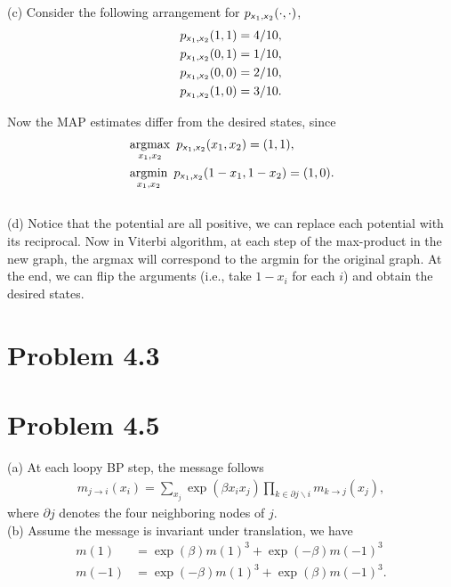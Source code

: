 \documentclass{article}
\newcommand{\s}[1]{\textsf{\textit{#1}}}
\newcommand{\qeds}{\hfill\qedsymbol}
\DeclareMathOperator*{\argmax}{argmax}
\DeclareMathOperator*{\argmin}{argmin}
\begin{document}
\noindent
(c)
%
Consider the following arrangement for $p_{\s{x}_1, \s{x}_2}(\cdot, \cdot)$,
\begin{align*}
	p_{\s{x}_1, \s{x}_2}(1, 1) &= 4/10,\\
	p_{\s{x}_1, \s{x}_2}(0, 1) &= 1/10,\\
	p_{\s{x}_1, \s{x}_2}(0, 0) &= 2/10,\\
	p_{\s{x}_1, \s{x}_2}(1, 0) &= 3/10.
\end{align*}

Now the MAP estimates differ from the desired states, since
\begin{align*}
	&\argmax_{x_1, x_2}\ p_{\s{x}_1, \s{x}_2}(x_1, x_2) = (1, 1),\\
	&\argmin_{x_1, x_2}\ p_{\s{x}_1, \s{x}_2}(1-x_1, 1-x_2) = (1, 0).
\end{align*}\qeds
\\

\noindent
(d)
%
Notice that the potential are all positive, we can replace each potential with its reciprocal.
Now in Viterbi algorithm, at each step of the max-product in the new graph, the argmax will correspond
to the argmin for the original graph. At the end, we can flip the arguments (i.e., take $1-x_i$ for each $i$)
and obtain the desired states.

\pagebreak
\section*{Problem 4.3}

\pagebreak
\section*{Problem 4.5}
%
(a) At each loopy BP step, the message follows
\begin{align*}
	m_{j\to i}(x_i) = \sum_{x_j}\exp(\beta x_i x_j)\prod_{k\in \partial j \backslash i} m_{k\to j}(x_j),
\end{align*}
where $\partial j$ denotes the four neighboring nodes of $j$.
\\

\noindent
(b) Assume the message is invariant under translation, we have
\begin{align*}
	m(1) &= \exp(\beta)m(1)^3 + \exp(-\beta)m(-1)^3\\
	m(-1) &= \exp(-\beta)m(1)^3 + \exp(\beta)m(-1)^3.
\end{align*}
%
\end{document}
